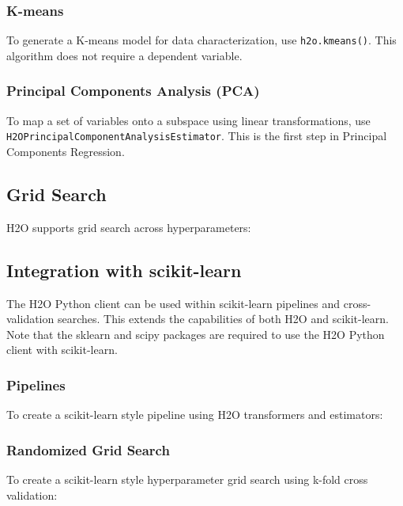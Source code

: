 {

\subsubsection{K-means}
To generate a K-means model for data characterization, use
{\texttt{h2o.kmeans()}}. This algorithm does not require a
dependent variable.



\subsubsection{Principal Components Analysis (PCA)}
To map a set of variables onto a subspace using linear
transformations, use {\texttt{H2OPrincipalComponentAnalysisEstimator}}.
This is the first step in Principal Components Regression.


\subsection{Grid Search}
H2O supports grid search across hyperparameters:



\subsection{Integration with scikit-learn}
The H2O Python client can be used within scikit-learn pipelines and cross-validation searches.  This extends the capabilities of both H2O and scikit-learn. Note that the sklearn and scipy packages are required to use the H2O Python client with scikit-learn. 

\subsubsection{Pipelines}

To create a scikit-learn style pipeline using H2O transformers and estimators:



\subsubsection{Randomized Grid Search}
To create a scikit-learn style hyperparameter grid search using k-fold cross validation:


}
